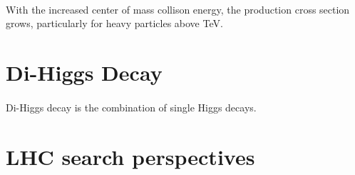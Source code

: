 \paragraph{}
With the increased center of mass collison energy, the production cross section grows, particularly for heavy particles above TeV.


\section{Di-Higgs Decay}
\paragraph{}
Di-Higgs decay is the combination of single Higgs decays. 


\section{LHC search perspectives}
